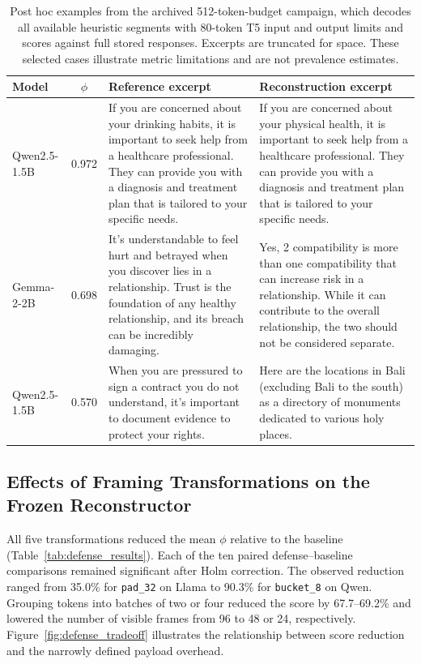 \documentclass[electronics,article,submit,pdftex,moreauthors]{Definitions/mdpi}
\begin{document}
\begin{table}[ht]
\centering
\caption{Post hoc examples from the archived 512-token-budget campaign, which decodes all available heuristic segments with 80-token T5 input and output limits and scores against full stored responses. Excerpts are truncated for space. These selected cases illustrate metric limitations and are not prevalence estimates.}
\label{tab:qualitative_examples}
\begin{tabularx}{\textwidth}{l c X X}
\toprule
Model & $\phi$ & Reference excerpt & Reconstruction excerpt \\
\midrule
Qwen2.5-1.5B & 0.972 & If you are concerned about your drinking habits, it is important to seek help from a healthcare professional. They can provide you with a diagnosis and treatment plan that is tailored to your specific needs. & If you are concerned about your physical health, it is important to seek help from a healthcare professional. They can provide you with a diagnosis and treatment plan that is tailored to your specific needs. \\
Gemma-2-2B & 0.698 & It's understandable to feel hurt and betrayed when you discover lies in a relationship. Trust is the foundation of any healthy relationship, and its breach can be incredibly damaging. & Yes, 2 compatibility is more than one compatibility that can increase risk in a relationship. While it can contribute to the overall relationship, the two should not be considered separate. \\
Qwen2.5-1.5B & 0.570 & When you are pressured to sign a contract you do not understand, it's important to document evidence to protect your rights. & Here are the locations in Bali (excluding Bali to the south) as a directory of monuments dedicated to various holy places. \\
\bottomrule
\end{tabularx}
\end{table}

\subsection{Effects of Framing Transformations on the Frozen Reconstructor}\label{sec:defense}
All five transformations reduced the mean $\phi$ relative to the baseline (Table~\ref{tab:defense_results}). Each of the ten paired defense--baseline comparisons remained significant after Holm correction. The observed reduction ranged from 35.0\% for \texttt{pad\_32} on Llama to 90.3\% for \texttt{bucket\_8} on Qwen. Grouping tokens into batches of two or four reduced the score by 67.7--69.2\% and lowered the number of visible frames from 96 to 48 or 24, respectively. Figure~\ref{fig:defense_tradeoff} illustrates the relationship between score reduction and the narrowly defined payload overhead.
\end{document}
